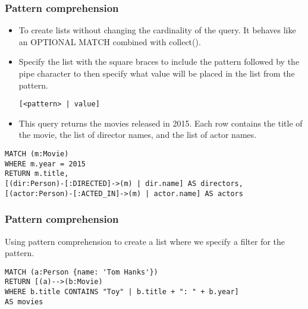 \begin{frame}[fragile]\frametitle{Pattern comprehension}

\begin{itemize}
\item To create lists without changing the cardinality of the query. It behaves like an OPTIONAL MATCH combined with collect().
\item Specify the list with the square braces to include the pattern followed by the pipe character to then specify what value will be placed in the list from the pattern.

\lstinline{[<pattern> | value]}
\item This query returns the movies released in 2015. Each row contains the title of the movie, the list of director names, and the list of actor names.
\end{itemize}

\begin{lstlisting}
MATCH (m:Movie)
WHERE m.year = 2015
RETURN m.title,
[(dir:Person)-[:DIRECTED]->(m) | dir.name] AS directors,
[(actor:Person)-[:ACTED_IN]->(m) | actor.name] AS actors
\end{lstlisting}


\end{frame}

\begin{frame}[fragile]\frametitle{Pattern comprehension}

Using pattern comprehension to create a list where we specify a filter for the pattern.

\begin{lstlisting}
MATCH (a:Person {name: 'Tom Hanks'})
RETURN [(a)-->(b:Movie)
WHERE b.title CONTAINS "Toy" | b.title + ": " + b.year]
AS movies
\end{lstlisting}


\end{frame}

